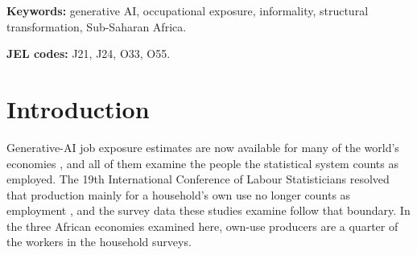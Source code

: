 \begin{abstract}
\noindent
This paper measures how exposed workers are to generative AI in three
Sub-Saharan African economies, using household surveys that reach agricultural
and own-account workers and the own-use producers outside the employment
boundary. Across 24,838 workers
in Nigeria, Tanzania and Uganda the mean task-exposure score is 0.072, and
0.090 weighted, on the moderate 2030 Qwen 2.5 ratings, and runs 0.045 to
0.489 across nine versions. Agricultural workers average 0.029 against 0.134
for non-agricultural own-account workers and 0.150 for non-agricultural wage
employees. Inside wage work, formal employees average 0.213 against 0.104 for
informal ones. Clerical support, the most exposed major occupational group at
0.615, holds 0.6 percent of the sample. Giving employed workers a high-income
occupational mix, with their own occupation scores, raises exposure from 0.088
to 0.209.
\end{abstract}

\vspace{6pt}
\noindent\textbf{Keywords:} generative AI, occupational exposure, informality, structural transformation, Sub-Saharan Africa.

\noindent\textbf{JEL codes:} J21, J24, O33, O55.
\vspace{6pt}

\section{Introduction}

Generative-AI job exposure estimates are now available for many of the world's economies
\citep{felten2021,eloundou2024,gmyrek2023}, and all of them examine the people the statistical
system counts as employed. The 19th International Conference of Labour Statisticians resolved
that production mainly for a household's own use no longer counts as employment
\citep{icls2013}, and the survey data these studies examine follow that boundary. 
In the three
African economies examined here, own-use producers are a quarter of the workers in the
household surveys.

